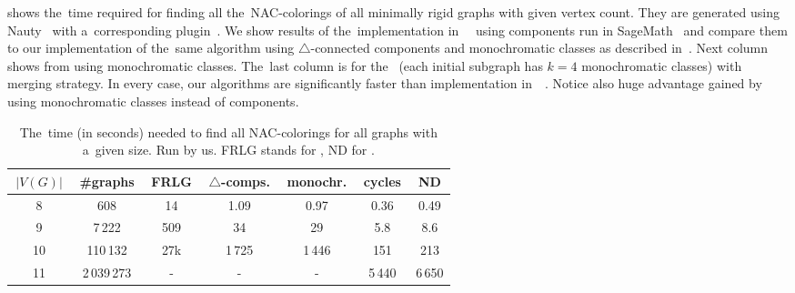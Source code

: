 shows the~time required for finding all the~NAC-colorings
of all minimally rigid graphs with given vertex count.
%
They are generated using Nauty~\cite{nauty}
with a~corresponding plugin~\cite{nauty_plugin}.
%
We show results of the~implementation
in~\flexrilog{}~\cite{flexrilog} using \trcon{} components
run in SageMath~\cite{sagemath}
and compare them to our implementation of the~same \Naive{} algorithm
using $\triangle$-connected components
and monochromatic classes as described in~.
Next column shows \NaiveCycles{} from 
using monochromatic classes.
The~last column is for the~\NeighborsDegree{} (each initial subgraph has $k=4$ monochromatic classes)
with \MergeLinear{} merging strategy.
%
In every case, our algorithms are significantly faster than implementation in~\flexrilog{}~\cite{flexrilog}.
Notice also huge advantage gained by using monochromatic classes instead of \trcon{} components.
%
\begin{table}[ht]
	\caption[Running times on graphs]{
		The~time (in seconds) needed to find all NAC-colorings for all graphs with a~given size. Run by us.
		\textsc{FRLG} stands for \flexrilog{}, \textsc{ND} for \NeighborsDegree{}.}%
	\label{tab:all_min_rigid}
	\centering
	\begin{tabular}{ccccccc}
		\hline
		\,$|V(G)|$\, & \,\#graphs\, & \,FRLG\, & \,$\triangle$-comps.\, & \,monochr.\, & \,cycles\, & \,\textsc{ND}\, \\
		\hline
		8            & 608          & 14       & 1.09                   & 0.97         & 0.36       & 0.49            \\
		9            & 7\,222       & 509      & 34                     & 29           & 5.8        & 8.6             \\
		10           & 110\,132     & 27k      & 1\,725                 & 1\,446       & 151        & 213             \\
		11           & 2\,039\,273  & -        & -                      & -            & 5\,440     & 6\,650          \\
		\hline
	\end{tabular}
\end{table}

